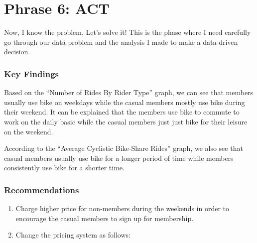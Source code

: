 \documentclass[
]{article}
\newenvironment{Shaded}{\begin{snugshade}}{\end{snugshade}}
\newcommand{\AttributeTok}[1]{\textcolor[rgb]{0.77,0.63,0.00}{#1}}
\newcommand{\CommentTok}[1]{\textcolor[rgb]{0.56,0.35,0.01}{\textit{#1}}}
\newcommand{\FunctionTok}[1]{\textcolor[rgb]{0.00,0.00,0.00}{#1}}
\newcommand{\NormalTok}[1]{#1}
\newcommand{\OtherTok}[1]{\textcolor[rgb]{0.56,0.35,0.01}{#1}}
\newcommand{\SpecialCharTok}[1]{\textcolor[rgb]{0.00,0.00,0.00}{#1}}
\newcommand{\StringTok}[1]{\textcolor[rgb]{0.31,0.60,0.02}{#1}}
\providecommand{\tightlist}{%
  \setlength{\itemsep}{0pt}\setlength{\parskip}{0pt}}
\begin{document}
\begin{Shaded}
\end{Shaded}

\hypertarget{phrase-6-act}{%
\section{Phrase 6: ACT}\label{phrase-6-act}}

Now, I know the problem, Let's solve it! This is the phase where I need
carefully go through our data problem and the analysis I made to make a
data-driven decision.

\hypertarget{key-findings}{%
\subsubsection{Key Findings}\label{key-findings}}

Based on the ``Number of Rides By Rider Type'' graph, we can see that
members usually use bike on weekdays while the casual members mostly use
bike during their weekend. It can be explained that the members use bike
to commute to work on the daily basic while the casual members just just
bike for their leisure on the weekend.

According to the ``Average Cyclistic Bike-Share Rides'' graph, we also
see that casual members usually use bike for a longer period of time
while members consistently use bike for a shorter time.

\hypertarget{recommendations}{%
\subsubsection{Recommendations}\label{recommendations}}

\begin{enumerate}
\def\labelenumi{\arabic{enumi}.}
\tightlist
\item
  Charge higher price for non-members during the weekends in order to
  encourage the casual members to sign up for membership.
\item
  Change the pricing system as follows:
\end{enumerate}
\end{document}
